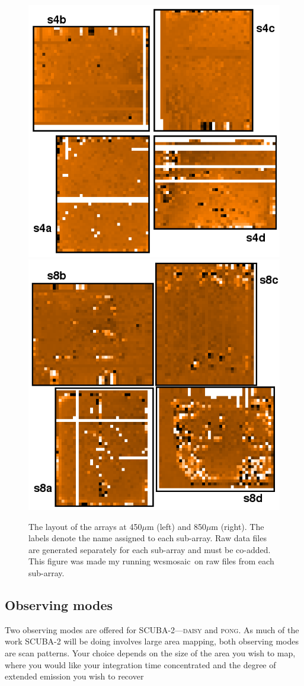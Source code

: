 \documentclass[twoside,11pt]{article}
\newcommand{\xref}[3]{#1}
\newcommand{\xlabel}[1]{}
\renewcommand{\_}{\texttt{\symbol{95}}}
\newcommand{\task}[1]{\textsf{#1}}
\newcommand{\wcsmosaic}{\xref{\task{wcsmosaic}}{sun95}{WCSMOSAIC}}
\begin{document}
\begin{figure}[t!]
\begin{center}
\includegraphics[width=0.4\linewidth]{sc21_450array}
\hspace{1cm}
\includegraphics[width=0.4\linewidth]{sc21_850array}
\label{fig:arrays}
\caption[The physical layout of the arrays at each wavelength]{
  \small The layout of the arrays at 450$\mu$m (left) and
  850$\mu$m (right). The labels denote the name assigned to each
  sub-array. Raw data files are generated separately for each sub-array
  and must be co-added. This figure was made my running \wcsmosaic\ on
  raw files from each sub-array.
}
\end{center}
\end{figure}

\subsection{\xlabel{obs_modes}Observing modes}
\label{sec:mmodes}

Two observing modes are offered for SCUBA-2---\textsc{daisy} and
\textsc{pong}. As much of the work SCUBA-2 will be doing involves
large area mapping, both observing modes are scan patterns. Your
choice depends on the size of the area you wish to map, where you
would like your integration time concentrated and the degree of
extended emission you wish to recover
\end{document}
